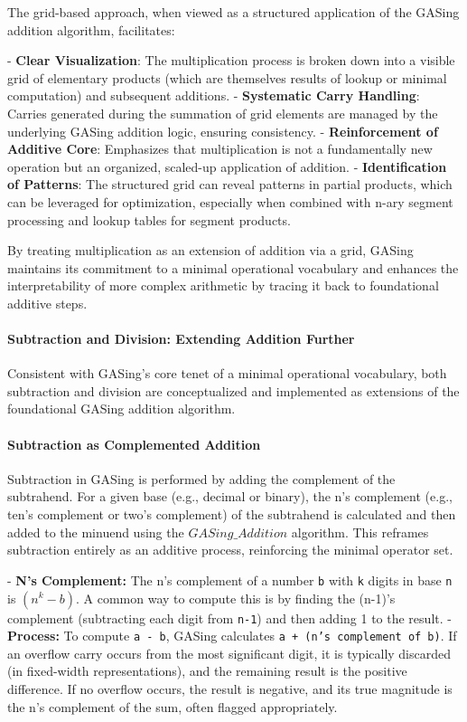 The grid-based approach, when viewed as a structured application of the GASing addition algorithm, facilitates:

-   \textbf{Clear Visualization}: The multiplication process is broken down into a visible grid of elementary products (which are themselves results of lookup or minimal computation) and subsequent additions.
-   \textbf{Systematic Carry Handling}: Carries generated during the summation of grid elements are managed by the underlying GASing addition logic, ensuring consistency.
-   \textbf{Reinforcement of Additive Core}: Emphasizes that multiplication is not a fundamentally new operation but an organized, scaled-up application of addition.
-   \textbf{Identification of Patterns}: The structured grid can reveal patterns in partial products, which can be leveraged for optimization, especially when combined with n-ary segment processing and lookup tables for segment products.

By treating multiplication as an extension of addition via a grid, GASing maintains its commitment to a minimal operational vocabulary and enhances the interpretability of more complex arithmetic by tracing it back to foundational additive steps.
\paragraph{Subtraction and Division: Extending Addition Further}

Consistent with GASing's core tenet of a minimal operational vocabulary, both subtraction and division are conceptualized and implemented as extensions of the foundational GASing addition algorithm.
\paragraph{Subtraction as Complemented Addition}

Subtraction in GASing is performed by adding the complement of the subtrahend. For a given base (e.g., decimal or binary), the n's complement (e.g., ten's complement or two's complement) of the subtrahend is calculated and then added to the minuend using the \texttt{$GASing\_{Addition}$} algorithm. This reframes subtraction entirely as an additive process, reinforcing the minimal operator set.

- \textbf{N's Complement:} The n's complement of a number \texttt{b} with \texttt{k} digits in base \texttt{n} is \texttt{$(n^{k} - b)$}. A common way to compute this is by finding the (n-1)'s complement (subtracting each digit from \texttt{n-1}) and then adding 1 to the result.
- \textbf{Process:} To compute \texttt{a - b}, GASing calculates \texttt{a + (n's complement of b)}. If an overflow carry occurs from the most significant digit, it is typically discarded (in fixed-width representations), and the remaining result is the positive difference. If no overflow occurs, the result is negative, and its true magnitude is the n's complement of the sum, often flagged appropriately.



